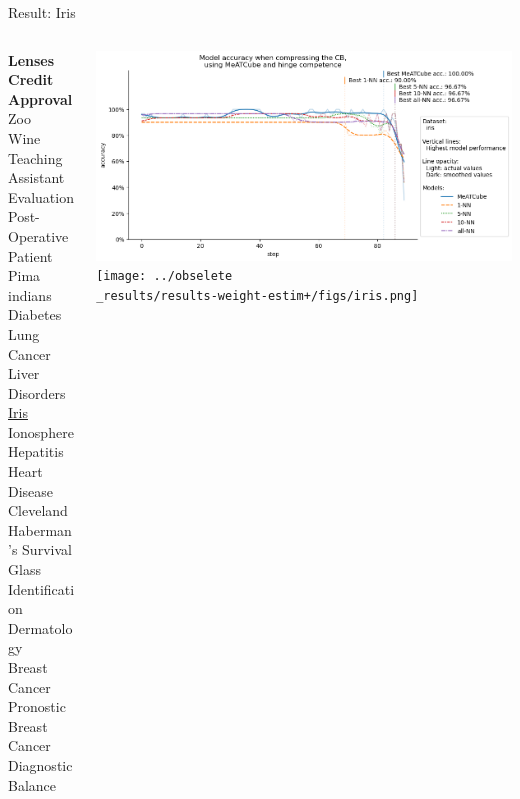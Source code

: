 \documentclass[]{beamer}
\begin{document}
\begin{frame}{Result: Iris}
    \begin{columns}
        \begin{column}{.3\textwidth}
            {\smaller\smaller\smaller
            \textbf{Lenses} \\
            \textbf{Credit Approval} \\
            Zoo \\
            Wine \\
            Teaching Assistant Evaluation \\
            Post-Operative Patient \\
            Pima indians Diabetes \\
            Lung Cancer \\
            Liver Disorders \\
            \underline{Iris} \\
            Ionosphere \\
            Hepatitis \\
            Heart Disease Cleveland \\
            Haberman's Survival \\
            Glass Identification \\
            Dermatology \\
            Breast Cancer Pronostic \\
            Breast Cancer Diagnostic \\
            Balance\\
            ~}
        \end{column}
        \begin{column}{.7\textwidth}
            \includegraphics[width=\textwidth]{../results-no-sim-tuning+/figs/iris.png}
            \texttt{[image: ../obselete\\\_results/results-weight-estim+/figs/iris.png]}
        \end{column}
    \end{columns}
\end{frame}
\end{document}

